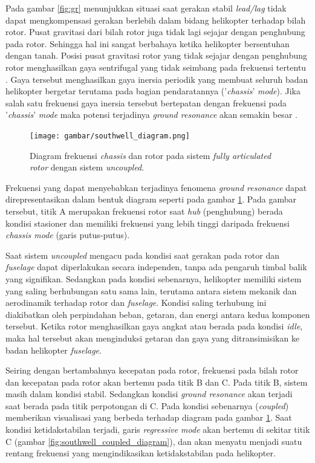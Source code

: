 Pada gambar \ref{fig:gr} menunjukkan situasi saat gerakan stabil \textit{lead/lag} tidak dapat mengkompensasi gerakan berlebih dalam bidang helikopter terhadap bilah rotor. Pusat gravitasi dari bilah rotor juga tidak lagi sejajar dengan penghubung pada rotor. Sehingga hal ini sangat berbahaya ketika helikopter bersentuhan dengan tanah. Posisi pusat gravitasi rotor yang tidak sejajar dengan penghubung rotor menghasilkan gaya sentrifugal yang tidak seimbang pada frekuensi tertentu \cite{Eckert2007AnalyticalAA}. Gaya tersebut menghasilkan gaya inersia periodik yang membuat seluruh badan helikopter bergetar terutama pada bagian pendaratannya ('\textit{chassis}' \textit{mode}). Jika salah satu frekuensi gaya inersia tersebut bertepatan dengan frekuensi pada '\textit{chassis}' \textit{mode} maka potensi terjadinya \textit{ground resonance} akan semakin besar \cite{bramwell2001bramwell}.

\begin{figure}[H]
	\centering
	\texttt{[image: gambar/southwell\_diagram.png]}
	\caption{Diagram frekuensi \textit{chassis} dan rotor pada sistem \textit{fully articulated rotor} dengan sistem \textit{uncoupled}\cite{bramwell2001bramwell}.}
	\label{fig:southwell_diagram}
\end{figure}

Frekuensi yang dapat menyebabkan terjadinya fenomena \textit{ground resonance} dapat direpresentasikan dalam bentuk diagram seperti pada gambar \ref{fig:southwell_diagram}. Pada gambar tersebut, titik A merupakan frekuensi rotor saat \textit{hub} (penghubung) berada kondisi stasioner dan memiliki frekuensi yang lebih tinggi daripada frekuensi \textit{chassis mode} (garis putus-putus). 

Saat sistem \textit{uncoupled} mengacu pada kondisi saat gerakan pada rotor dan \textit{fuselage} dapat diperlakukan secara independen, tanpa ada pengaruh timbal balik yang signifikan. Sedangkan pada kondisi sebenarnya, helikopter memiliki sistem yang saling berhubungan satu sama lain, terutama antara sistem mekanik dan aerodinamik terhadap rotor dan \textit{fuselage}. Kondisi saling terhubung ini diakibatkan oleh perpindahan beban, getaran, dan energi antara kedua komponen tersebut. Ketika rotor menghasilkan gaya angkat atau berada pada kondisi \textit{idle}, maka hal tersebut akan menginduksi getaran dan gaya yang ditransimisikan ke badan helikopter \textit{fuselage}. 

Seiring dengan bertambahnya kecepatan pada rotor, frekuensi pada bilah rotor dan kecepatan pada rotor akan bertemu pada titik B dan C. Pada titik B, sistem masih dalam kondisi stabil. Sedangkan kondisi \textit{ground resonance} akan terjadi saat berada pada titik perpotongan di C. Pada kondisi sebenarnya (\textit{coupled}) memberikan visualisasi yang berbeda terhadap diagram pada gambar \ref{fig:southwell_diagram}. Saat kondisi ketidakstabilan terjadi, garis \textit{regressive mode} akan bertemu di sekitar titik C (gambar \ref{fig:southwell_coupled_diagram}), dan akan menyatu menjadi suatu rentang frekuensi yang mengindikasikan ketidakstabilan pada helikopter. 

